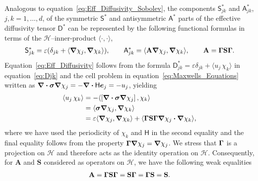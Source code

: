 \documentclass[leqno,onefignum,onetabnum]{siamltex1213}
\newcommand{\Tb}{\mathbf{T}}
\newcommand{\Sb}{\mathbf{S}}
\newcommand{\Ab}{\mathbf{A}}
\newcommand{\bI}{\mathbf{I}}
\newcommand{\Hc}{\mathcal{H}}
\newcommand{\Dm}{\mathsf{D}}
\newcommand{\Hm}{\mathsf{H}}
\newcommand{\Sm}{\mathsf{S}}
\newcommand{\Am}{\mathsf{A}}
\newcommand\bsig{\mbox{\boldmath${\sigma}$}}
\newcommand\bGamma{\mbox{\boldmath${\Gamma}$}}
\newcommand\bnabla{\mbox{\boldmath${\nabla}$}}
\providecommand\bcdot{\boldsymbol{\cdot}}
\newcommand{\vece}{\boldsymbol{e}}
\begin{document}
Analogous to equation~\eqref{eq:Eff_Diffusivity_Sobolev}, the
components $\Sm^*_{jk}$ and $\Am^*_{jk}$, $j,k=1,\ldots,d$, of the
symmetric $\Sm^*$ and antisymmetric $\Am^*$ parts of the effective
diffusivity tensor $\Dm^*$ can be represented by the following
functional formulas in terms of the $\Hc$--inner-product $\langle\cdot,\cdot\rangle$,
%
\begin{align}\label{eq:Eff_Diffusivity}
 \Sm^*_{jk}=\varepsilon(\delta_{jk}+\langle\bnabla \chi_j,\bnabla \chi_k\rangle), 
  \qquad
 \Am^*_{jk}=\langle\Ab\bnabla \chi_j,\bnabla \chi_k\rangle, 
  \qquad
 \Ab=\bGamma\Sb\bGamma.
\end{align}
%
Equation~\eqref{eq:Eff_Diffusivity} follows from the formula
$\Dm^*_{jk}=\varepsilon\delta_{jk}+\langle u_j\,\chi_k\rangle$ in equation~\eqref{eq:Djk} and the
cell problem in equation~\eqref{eq:Maxwells_Equations} written as
$\bnabla\bcdot\bsig\bnabla\chi_j=-\bnabla\bcdot\Hm\vece_j=-u_j$, yielding 
%
\begin{align}\label{eq:Functional_Rep}
  \langle u_j\,\chi_k\rangle&=-\langle[\bnabla\bcdot\bsig\bnabla\chi_j]\,,\chi_k\rangle
       \\\notag
       &=\langle\bsig\bnabla\chi_j,\bnabla\chi_k\rangle
       \\\notag
       &=\varepsilon\langle\bnabla\chi_j,\bnabla\chi_k\rangle
         +\langle\bGamma\Sb\bGamma\bnabla\chi_j\bcdot\bnabla\chi_k\rangle,
         \notag
\end{align}
%
where we have used the periodicity of $\chi_k$ and $\Hm$ in the second
equality and the final equality follows from the property
$\bGamma\bnabla\chi_j=\bnabla\chi_j$. We stress that $\bGamma$ is a
projection on $\Hc$ and therefore acts as the identity operation on
$\Hc$. Consequently, for $\Ab$ and $\Sb$ considered as operators on
$\Hc$, we have the following weak equalities
%
\begin{align}\label{eq:StoA}
  \Ab=\bGamma\Sb\bGamma=\Sb\bGamma=\bGamma\Sb=\Sb.
\end{align}
%
\end{document}
